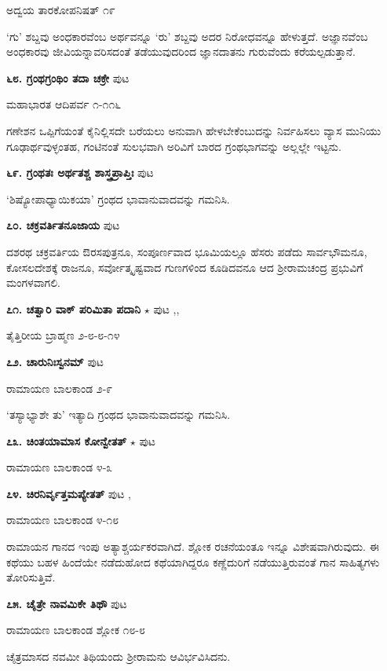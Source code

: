 \hfill ಅದ್ವಯ ತಾರಕೋಪನಿಷತ್ ೧೯

`ಗು' ಶಬ್ದವು ಅಂಧಕಾರವೆಂಬ ಅರ್ಥವನ್ನೂ `ರು' ಶಬ್ದವು ಅದರ ನಿರೋಧವನ್ನೂ ಹೇಳುತ್ತದೆ. ಅಜ್ಞಾನವೆಂಬ ಅಂಧಕಾರವು ಜೀವಿಯನ್ನಾವರಿಸದಂತೆ ತಡೆಯುವುದರಿಂದ ಜ್ಞಾನದಾತನು ಗುರುವೆಂದು ಕರೆಯಲ್ಪಡುತ್ತಾನೆ.

\medskip
\noindent\textbf{೬೮. ಗ್ರಂಥಗ್ರಂಥಿಂ ತದಾ ಚಕ್ರೇ} \hfill ಪುಟ \pageref{119}

\hfill ಮಹಾಭಾರತ ಆದಿಪರ್ವ ೧-೧೧೬

ಗಣೇಶನ ಒಪ್ಪಿಗೆಯಂತೆ ಕೈನಿಲ್ಲಿಸದೇ ಬರೆಯಲು ಅನುವಾಗಿ ಹೇಳಬೇಕೆಂಬುದನ್ನು ನಿರ್ವಹಿಸಲು ವ್ಯಾಸ ಮುನಿಯು ಗೂಢಾರ್ಥವುಳ್ಳಂತಹ, ಗಂಟಿನಂತೆ ಸುಲಭವಾಗಿ ಅರಿವಿಗೆ ಬಾರದ ಗ್ರಂಥಭಾಗವನ್ನು ಅಲ್ಲಲ್ಲೇ ಇಟ್ಟನು.

\medskip
\noindent\textbf{೬೯. ಗ್ರಂಥತಃ ಅರ್ಥತಶ್ಚ ಶಾಸ್ತ್ರಪ್ರಾಪ್ತಿಃ} \hfill ಪುಟ \pageref{105}

\hfill `ಶಿಷ್ಯೋಪಾಧ್ಯಾಯಿಕಯಾ' ಗ್ರಂಥದ ಭಾವಾನುವಾದವನ್ನು ಗಮನಿಸಿ.

\medskip
\noindent\textbf{೭೦. ಚಕ್ರವರ್ತಿತನೂಜಾಯ}  \hfill ಪುಟ \pageref{193}

ದಶರಥ ಚಕ್ರವರ್ತಿಯ ಔರಸಪುತ್ರನೂ, ಸಂಪೂರ್ಣವಾದ ಭೂಮಿಯಲ್ಲೂ ಹೆಸರು ಪಡೆದು ಸಾರ್ವಭೌಮನೂ, ಕೋಸಲದೇಶಕ್ಕೆ ರಾಜನೂ, ಸರ್ವೋತ್ಕೃಷ್ಟವಾದ ಗುಣಗಳಿಂದ ಕೂಡಿದವನೂ ಆದ ಶ್ರೀರಾಮಚಂದ್ರ ಪ್ರಭುವಿಗೆ ಮಂಗಳವಾಗಲಿ.

\medskip
\noindent\textbf{೭೧. ಚತ್ವಾರಿ ವಾಕ್ ಪರಿಮಿತಾ ಪದಾನಿ} $\star$ \hfill ಪುಟ \pageref{22},\pageref{153},\pageref{252}

\hfill ತೈತ್ತಿರೀಯ ಬ್ರಾಹ್ಮಣ ೨-೮-೮-೧೪

\medskip
\noindent\textbf{೭೨. ಚಾರುನಿಃಸ್ವನಮ್} \hfill ಪುಟ \pageref{250}

\hfill ರಾಮಾಯಣ ಬಾಲಕಾಂಡ ೨-೯

`ತಸ್ಯಾಭ್ಯಾಶೇ ತು' ಇತ್ಯಾದಿ ಗ್ರಂಥದ ಭಾವಾನುವಾದವನ್ನು ಗಮನಿಸಿ.

\medskip
\noindent\textbf{೭೩. ಚಿಂತಯಾಮಾಸ ಕೋನ್ವೇತತ್} $\star$ \hfill ಪುಟ \pageref{158}

\hfill ರಾಮಾಯಣ ಬಾಲಕಾಂಡ ೪-೩

\medskip
\noindent\textbf{೭೪. ಚಿರನಿರ್ವೃತ್ತಮಪ್ಯೇತತ್} \hfill ಪುಟ \pageref{204},\pageref{243}

\hfill ರಾಮಾಯಣ ಬಾಲಕಾಂಡ ೪-೧೮

ರಾಮಾಯನ ಗಾನದ ಇಂಪು ಅತ್ಯಾಶ್ಚರ್ಯಕರವಾಗಿದೆ. ಶ್ಲೋಕ ರಚನೆಯಂತೂ ಇನ್ನೂ ವಿಶೇಷವಾಗಿರುವುದು. ಈ ಕಥೆಯು ಬಹಳ ಹಿಂದೆಯೇ ನಡೆದುಹೋದ ಕಥೆಯಾಗಿದ್ದರೂ ಕಣ್ಣೆದುರಿಗೆ ನಡೆಯುತ್ತಿರುವಂತೆ ಗಾನ ಸಾಹಿತ್ಯಗಳು ತೋರಿಸುತ್ತಿವೆ.

\medskip
\noindent\textbf{೭೫. ಚೈತ್ರೇ ನಾವಮಿಕೇ ತಿಥೌ} \hfill ಪುಟ \pageref{147}

\hfill ರಾಮಾಯಣ ಬಾಲಕಾಂಡ ಶ್ಲೋಕ ೧೮-೮

ಚೈತ್ರಮಾಸದ ನವಮೀ ತಿಥಿಯಂದು ಶ್ರೀರಾಮನು ಆವಿರ್ಭವಿಸಿದನು.

